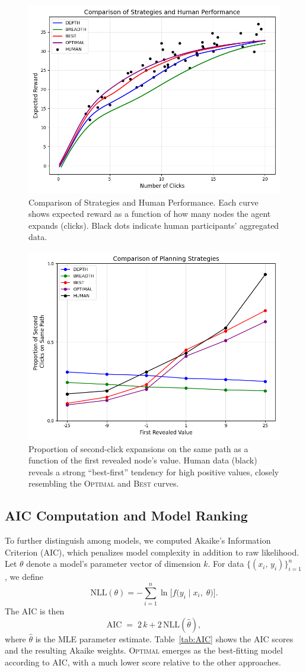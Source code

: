 \documentclass[a4paper,12pt,oneside,article]{memoir}
\begin{document}
\begin{figure}[h]
    \centering
    \includegraphics[width=0.6\linewidth]{image2.png}
    \caption{Comparison of Strategies and Human Performance. Each curve shows expected reward as a function of how many nodes the agent expands (clicks). Black dots indicate human participants’ aggregated data.}
    \label{fig:reward_vs_clicks}
\end{figure}

\begin{figure}[h]
    \centering
    \includegraphics[width=0.6\linewidth]{image3.png}
    \caption{Proportion of second-click expansions on the same path as a function of the first revealed node's value. Human data (black) reveals a strong “best-first” tendency for high positive values, closely resembling the \textsc{Optimal} and \textsc{Best} curves.}
    \label{fig:second_click}
\end{figure}

\subsection*{AIC Computation and Model Ranking}
To further distinguish among models, we computed Akaike’s Information Criterion (AIC), which penalizes model complexity in addition to raw likelihood. Let \(\theta\) denote a model’s parameter vector of dimension \(k\). For data \(\{(x_i,\,y_i)\}_{i=1}^n\), we define
\[
\mathrm{NLL}(\theta)
=
- \sum_{i=1}^n 
  \ln \bigl[
    f\bigl(y_i \mid x_i,\;\theta\bigr)
  \bigr].
\]
The AIC is then
\[
\mathrm{AIC} \;=\; 2\,k + 2\,\mathrm{NLL}(\hat{\theta}),
\]
where \(\hat{\theta}\) is the MLE parameter estimate. Table~\ref{tab:AIC} shows the AIC scores and the resulting Akaike weights. \textsc{Optimal} emerges as the best-fitting model according to AIC, with a much lower score relative to the other approaches.
\end{document}
